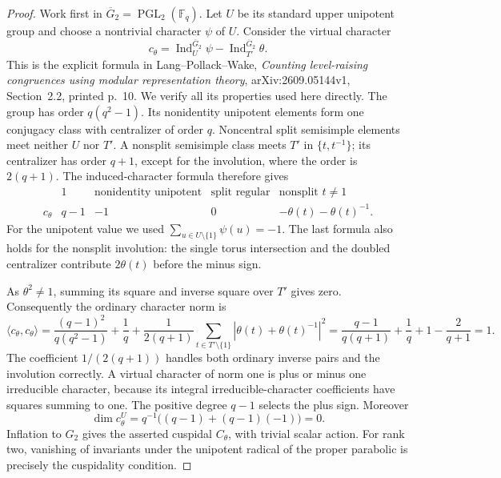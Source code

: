 \begin{proof}
Work first in $\overline G_2=\operatorname{PGL}_2(\mathbb F_q)$.
Let $U$ be its standard upper unipotent group and choose a
nontrivial character $\psi$ of $U$.  Consider the virtual character
\[
       c_\theta=\operatorname{Ind}_{U}^{\overline G_2}\psi
                         -\operatorname{Ind}_{T'}^{\overline G_2}\theta.
                                                        \tag{G72C.5}
\]
This is the explicit formula in Lang--Pollack--Wake,
\emph{Counting level-raising congruences using modular representation
theory}, arXiv:2609.05144v1, Section~2.2, printed p.~10.  We verify
all its properties used here directly.  The group has order
$q(q^2-1)$.  Its nonidentity unipotent elements form one conjugacy
class with centralizer of order $q$.  Noncentral split semisimple
elements meet neither $U$ nor $T'$.  A nonsplit semisimple class
meets $T'$ in $\{t,t^{-1}\}$; its centralizer has order $q+1$,
except for the involution, where the order is $2(q+1)$.
The induced-character formula therefore gives
\[
\begin{array}{c|cccc}
 &1&\text{nonidentity unipotent}&\text{split regular}
                                      &\text{nonsplit }t\ne1\\ \hline
 c_\theta&q-1&-1&0&-\theta(t)-\theta(t)^{-1}.
\end{array}                                                   \tag{G72C.6}
\]
For the unipotent value we used
$\sum_{u\in U\setminus\{1\}}\psi(u)=-1$.
The last formula also holds for the nonsplit involution: the
single torus intersection and the doubled centralizer contribute
$2\theta(t)$ before the minus sign.

As $\theta^2\ne1$, summing its square and inverse square over $T'$
gives zero.  Consequently the ordinary character norm is
\[
 \langle c_\theta,c_\theta\rangle
 =\frac{(q-1)^2}{q(q^2-1)}+\frac1q
   +\frac{1}{2(q+1)}\sum_{t\in T'\setminus\{1\}}
                          |\theta(t)+\theta(t)^{-1}|^2
 =\frac{q-1}{q(q+1)}+\frac1q+1-\frac2{q+1}=1.
                                                        \tag{G72C.7}
\]
The coefficient $1/(2(q+1))$ handles both ordinary inverse pairs
and the involution correctly.  A virtual character of norm one
is plus or minus one irreducible character, because its integral
irreducible-character coefficients have squares summing to one.
The positive degree $q-1$ selects the plus sign.  Moreover
\[
 \dim c_\theta^U
       =q^{-1}\bigl((q-1)+(q-1)(-1)\bigr)=0.             \tag{G72C.8}
\]
Inflation to $G_2$ gives the asserted cuspidal $C_\theta$, with
trivial scalar action.  For rank two, vanishing of invariants
under the unipotent radical of the proper parabolic is precisely
the cuspidality condition.


\end{proof}
